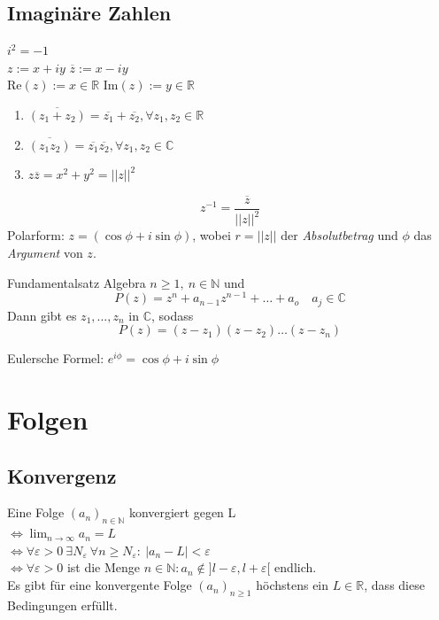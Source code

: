 \documentclass[a4paper,fontsize = 7pt]{scrartcl}
\def\R{\mathbb{R}}
\def\N{\mathbb{N}}
\begin{document}
\subsection{Imaginäre Zahlen}
\begin{center}
  $i^2 = -1$\\
  $z := x + iy$ \qquad $\overline{z} := x - iy$\\
  $\text{Re}(z) := x \in \R$ \qquad  $\text{Im}(z) := y \in \R$
\end{center}
\begin{subbox}{1.24}
  \vspace{-4pt}
    \begin{enumerate}
        \item $\overline{(z_1 + z_2)} = \overline{z_1} + \overline{z_2}, \forall z_1,z_2 \in \R$  
        \item $\overline{(z_1 z_2)} = \overline{z_1} \overline{z_2},  \forall z_1,z_2 \in \mathbb{C}$
        \item $z\overline{z} = x^2 + y^2 = ||z||^2$
    \end{enumerate}
    \vspace{-12pt}
\end{subbox}
\begin{equation*}
    z^{-1} = \frac{\overline{z}}{||z||^2}
\end{equation*}
Polarform: $z = ( \cos \phi + i \sin \phi)$, wobei $r = ||z||$ der \emph{Absolutbetrag} und $\phi$ das \emph{Argument} von $z$.
\begin{mainbox}{Fundamentalsatz Algebra}
  \vspace{-4pt}
    $n \geq 1,~n\in \mathbb{N}$ und 
    \begin{equation*}
        P(z) = z^n + a_{n-1} z^{n-1} + \ldots + a_o \quad a_j \in \mathbb{C}
    \end{equation*}
    Dann gibt es $z_1, ..., z_n$ in $\mathbb{C}$, sodass
    \begin{equation*}
        P(z) = (z - z_1)(z - z_2) \ldots(z-z_n)
    \end{equation*}
    \vspace{-16pt}
\end{mainbox}
Eulersche Formel: $e^{i\phi} = \cos \phi + i \sin \phi$

\section{Folgen}
\subsection{Konvergenz}
Eine Folge $(a_n)_{n\in \mathbb{N}}$ konvergiert gegen L \\ $\iff \lim_{n \to \infty} a_n = L $ 
\\ $\iff \forall \varepsilon > 0 \ \exists N_\varepsilon \ \forall n \ge N_\varepsilon : \ | a_n - L | < \varepsilon$
\\ $\iff \forall \varepsilon > 0 $ ist die Menge ${n \in \N: a_n \notin ]l-\varepsilon,l+\varepsilon[}$ endlich. 
\\ Es gibt für eine konvergente Folge $(a_n)_{n \geq 1}$ höchstens ein $L \in \R$, dass diese Bedingungen erfüllt.
\end{document}
